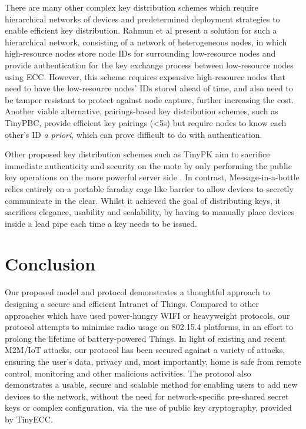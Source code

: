 \documentclass{mpaper}
\begin{document}
There are many other complex key distribution schemes which require hierarchical networks of devices \cite{MizanurRahman2010858,Shi2013235} and predetermined deployment strategies to enable efficient key distribution. Rahmun et al present a solution for such a hierarchical network\cite{MizanurRahman2010858}, consisting of a network of heterogeneous nodes, in which high-resource nodes store node IDs for surrounding low-resource nodes and provide authentication for the key exchange process between low-resource nodes using ECC. However, this scheme requires expensive high-resource nodes that need to have the low-resource nodes' IDs stored ahead of time, and also need to be tamper resistant to protect against node capture, further increasing the cost. Another viable alternative, pairings-based key distribution schemes, such as TinyPBC\cite{TinyPBC}, provide efficient key pairings (\textless5s) but require nodes to know each other's ID \textit{a priori}, which can prove difficult to do with authentication. 

Other proposed key distribution schemes such as TinyPK aim to sacrifice immediate authenticity and security on the mote by only performing the public key operations on the more powerful server side \cite{TinyPK}. In contrast, Message-in-a-bottle \cite{MessageBottle} relies entirely on a portable faraday cage like barrier to allow devices to secretly communicate in the clear. Whilst it achieved the goal of distributing keys, it sacrifices elegance, usability and scalability, by having to manually place devices inside a lead pipe each time a key needs to be issued.

\section{Conclusion}
\label{sec:conclusion}
Our proposed model and protocol demonstrates a thoughtful approach to designing a secure and efficient Intranet of Things. Compared to other approaches which have used power-hungry WIFI or heavyweight protocols, our protocol attempts to minimise radio usage on 802.15.4 platforms, in an effort to prolong the lifetime of battery-powered Things. In light of existing and recent M2M/IoT attacks, our protocol has been secured against a variety of attacks, ensuring the user's data, privacy and, most importantly, home is safe from remote control, monitoring and other malicious activities. The protocol also demonstrates a usable, secure and scalable method for enabling users to add new devices to the network, without the need for network-specific pre-shared secret keys or complex configuration, via the use of public key cryptography, provided by TinyECC. 
\end{document}
